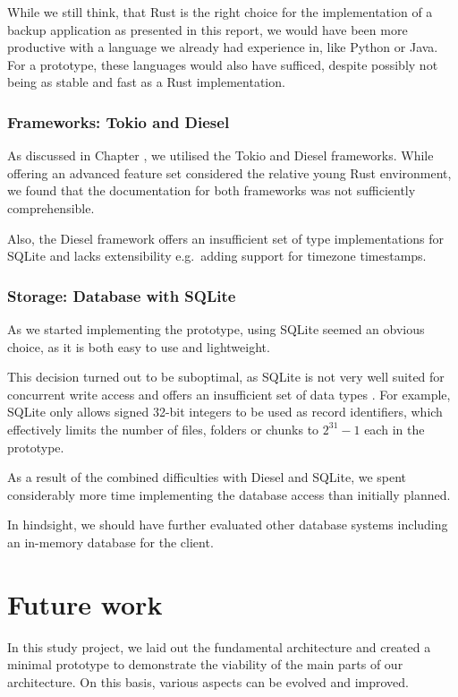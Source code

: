 While we still think, that Rust is the right choice for the implementation of a backup application as presented in this report, we would have been more productive with a language we already had experience in, like Python or Java. For a prototype, these languages would also have sufficed, despite possibly not being as stable and fast as a Rust implementation.

\subsubsection{Frameworks: Tokio and Diesel}
As discussed in Chapter , we utilised the Tokio and Diesel frameworks. While offering an advanced feature set considered the relative young Rust environment, we found that the documentation for both frameworks was not sufficiently comprehensible.

Also, the Diesel framework offers an insufficient set of type implementations for SQLite and lacks extensibility e.g.~adding support for timezone timestamps.

\subsubsection{Storage: Database with SQLite}
As we started implementing the prototype, using SQLite seemed an obvious choice, as it is both easy to use and lightweight.

This decision turned out to be suboptimal, as SQLite is not very well suited for concurrent write access \cite{sqlite-locking} and offers an insufficient set of data types \cite{sqlite-datatypes}. For example, SQLite only allows signed 32-bit integers to be used as record identifiers, which effectively limits the number of \glspl{file}, folders or \glspl{chunk} to $2^{31}-1$ each in the prototype.

As a result of the combined difficulties with Diesel and SQLite, we spent considerably more time implementing the database access than initially planned.

In hindsight, we should have further evaluated other database systems including an in-memory database for the \gls{client}.

\section{Future work}

In this study project, we laid out the fundamental architecture and created a minimal prototype to demonstrate the viability of the main parts of our architecture. On this basis, various aspects can be evolved and improved.


